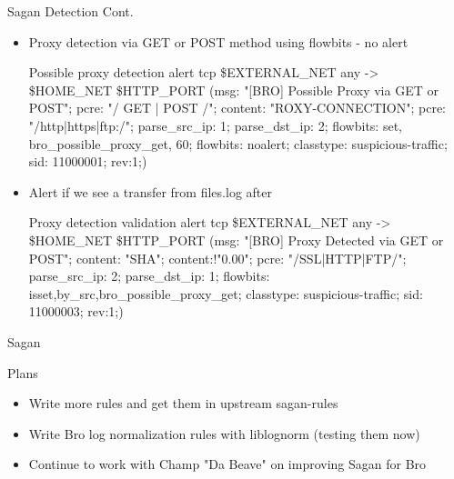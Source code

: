 \documentclass[xcolor=svgnames,handout]{beamer}
\begin{document}
\begin{frame}{Sagan Detection Cont.}
  \begin{itemize}
   \item Proxy detection via GET or POST method using flowbits - no alert
    \begin{exampleblock}{Possible proxy detection}
      \alert{alert tcp \$EXTERNAL\_NET any -> \$HOME\_NET \$HTTP\_PORT (msg: "[BRO] Possible
        Proxy via GET or POST"; pcre: "/ GET | POST /"; content: "ROXY-CONNECTION";
        pcre: "/http|https|ftp:\/\//"; parse\_src\_ip: 1; parse\_dst\_ip: 2;
        flowbits: set, bro\_possible\_proxy\_get, 60; flowbits: noalert;
        classtype: suspicious-traffic; sid: 11000001; rev:1;)}
    \end{exampleblock}
   \item Alert if we see a transfer from files.log after
    \begin{exampleblock}{Proxy detection validation}
      \alert{alert tcp \$EXTERNAL\_NET any -> \$HOME\_NET \$HTTP\_PORT (msg: "[BRO] Proxy
        Detected via GET or POST"; content: "SHA"; content:!"0.00"; pcre: "/SSL|HTTP|FTP/";
        parse\_src\_ip: 2; parse\_dst\_ip: 1; flowbits:
        isset,by\_src,bro\_possible\_proxy\_get; classtype: suspicious-traffic; sid: 11000003; rev:1;)}
    \end{exampleblock}
  \end{itemize}
\end{frame}

\begin{frame}{Sagan}
  \begin{block}{Plans}
    \begin{itemize}
      \item Write more rules and get them in upstream sagan-rules
      \item Write Bro log normalization rules with liblognorm (testing them now)
      \item Continue to work with Champ "Da Beave" on improving Sagan for Bro
    \end{itemize}
  \end{block}
\end{frame}
\end{document}
